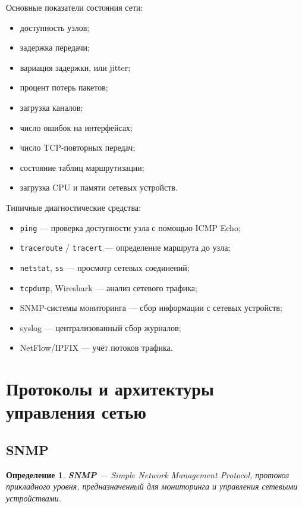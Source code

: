 \documentclass[12pt,a4paper]{article}
\newtheorem{definition}{Определение}
\begin{document}
Основные показатели состояния сети:
\begin{itemize}
    \item доступность узлов;
    \item задержка передачи;
    \item вариация задержки, или jitter;
    \item процент потерь пакетов;
    \item загрузка каналов;
    \item число ошибок на интерфейсах;
    \item число TCP-повторных передач;
    \item состояние таблиц маршрутизации;
    \item загрузка CPU и памяти сетевых устройств.
\end{itemize}

Типичные диагностические средства:
\begin{itemize}
    \item \texttt{ping} --- проверка доступности узла с помощью ICMP Echo;
    \item \texttt{traceroute} / \texttt{tracert} --- определение маршрута до узла;
    \item \texttt{netstat}, \texttt{ss} --- просмотр сетевых соединений;
    \item \texttt{tcpdump}, Wireshark --- анализ сетевого трафика;
    \item SNMP-системы мониторинга --- сбор информации с сетевых устройств;
    \item syslog --- централизованный сбор журналов;
    \item NetFlow/IPFIX --- учёт потоков трафика.
\end{itemize}

\section{Протоколы и архитектуры управления сетью}

\subsection{SNMP}

\begin{definition}
\textbf{SNMP} --- Simple Network Management Protocol, протокол прикладного уровня, предназначенный для мониторинга и управления сетевыми устройствами.
\end{definition}
\end{document}
